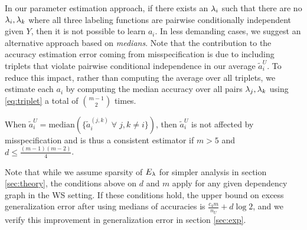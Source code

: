 
In our parameter estimation approach, if there exists an $\lambda_i$ such that there are no $\lambda_i, \lambda_k$ where all three labeling functions are pairwise conditionally independent given $Y$, then it is not possible to learn  $a_i$. In less demanding cases, %
we suggest an alternative approach based on \emph{medians}. Note that the contribution to the accuracy estimation error coming from misspecification is due to including triplets that violate pairwise conditional independence
in our average $\widetilde{a}_i^U$. To reduce this impact, rather than computing the average over all triplets, we estimate each $a_i$ by computing the median accuracy over all pairs $\lambda_j, \lambda_k$ using \eqref{eq:triplet} a total of ${m - 1 \choose 2}$ times.
\begin{proposition}
When $\widetilde{a}_i^U = \mathrm{median}(\{\widetilde{a}_i^{(j, k)} \; \forall \; j, k \neq i \})$, then $\widetilde{a}_i^U$ is not affected by misspecification and is thus a consistent estimator if $m > 5$ and $d \le \frac{(m - 1)(m - 2)}{4}$. 
\end{proposition}

Note that while we assume sparsity of $E_{\lambda}$ for simpler analysis in section \ref{sec:theory}, the conditions above on $d$ and $m$ apply for any given dependency graph in the WS setting. If these conditions hold, the upper bound on excess generalization error after using medians of accuracies is $\frac{c_4 m}{n_U} + d \log 2$, and we verify this improvement in generalization error in section \ref{sec:exp}. 


